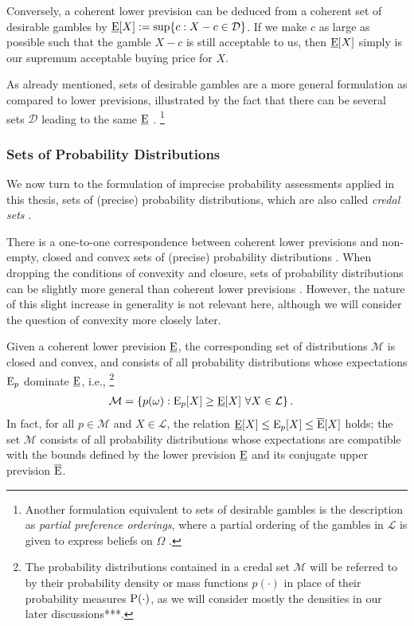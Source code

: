 Conversely, a coherent lower prevision can be deduced from a coherent set of desirable gambles by
$\underline{\operatorname{E}}[X] := \sup\{c: X - c \in \mathcal{D}\}$.
If we make $c$ as large as possible such that the gamble $X-c$ is still acceptable to us,
then $\underline{\operatorname{E}}[X]$ simply is our supremum acceptable buying price for $X$.

As already mentioned, sets of desirable gambles are a more general formulation
as compared to lower previsions, illustrated by the fact that there can be
several sets $\mathcal{D}$ leading to the same $\underline{\operatorname{E}}$ \parencite[p.~139]{2000:walley::towards}.%
\footnote{Another formulation equivalent to sets of desirable gambles is the description as \emph{partial preference orderings},
where a partial ordering of the gambles in $\mathcal{L}$ is given to express beliefs on $\Omega$
\parencite[p.~138]{2000:walley::towards}.}

\subsubsection{Sets of Probability Distributions}

We now turn to the formulation of imprecise probability assessments
applied in this thesis, 
sets of (precise) probability distributions,
which are also called \emph{credal sets} \parencite[e.g.,][p.~136]{2000:walley::towards}.

There is a one-to-one correspondence between coherent lower previsions
and non-empty, closed and convex sets of (precise) probability distributions
\parencite[\S 3.6.1]{1991:walley}.
When dropping the conditions of convexity and closure,
sets of probability distributions can be slightly more general
than coherent lower previsions \parencite[\S 5]{2000:walley::towards}.
However, the nature of this slight increase in generality is not relevant here,
although we will consider the question of convexity more closely later.

Given a coherent lower prevision $\underline{\operatorname{E}}$,
the corresponding set of distributions $\mathcal{M}$
is closed and convex, and consists of all probability distributions
whose expectations $\operatorname{E}_p$ dominate $\underline{\operatorname{E}}$, i.e.,%
\footnote{The probability distributions contained in a credal set $\mathcal{M}$
will be referred to by their probability density or mass functions $p(\cdot)$
in place of their probability measures $\operatorname{P}(\cdot)$, as we will consider mostly the densities
in our later discussions***.}
\begin{align*}
\mathcal{M} &= \{ p(\omega) : \operatorname{E}_p[X] \ge \underline{\operatorname{E}}[X]\ \forall X \in \mathcal{L}\}\,.
\end{align*}
In fact, for all $p \in \mathcal{M}$ and $X \in \mathcal{L}$,
the relation $\underline{\operatorname{E}}[X] \le \operatorname{E}_p[X] \le \overline{\operatorname{E}}[X]$ holds;
the set $\mathcal{M}$ consists of all probability distributions
whose expectations are compatible with the bounds defined by
the lower prevision $\underline{\operatorname{E}}$ and its conjugate upper prevision $\overline{\operatorname{E}}$.

